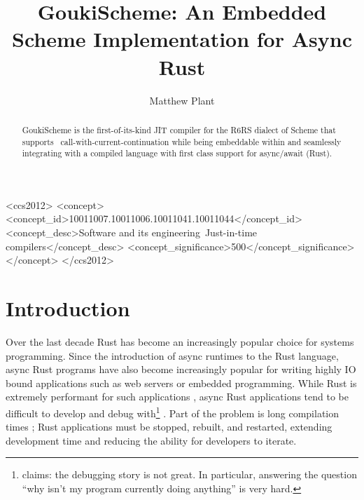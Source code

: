 \documentclass[sigplan]{acmart}
\begin{document}

\begin{CCSXML}
<ccs2012>
   <concept>
       <concept_id>10011007.10011006.10011041.10011044</concept_id>
       <concept_desc>Software and its engineering~Just-in-time compilers</concept_desc>
       <concept_significance>500</concept_significance>
       </concept>
 </ccs2012>
\end{CCSXML}


\title{GoukiScheme: An Embedded Scheme Implementation for Async Rust}

\author{Matthew Plant}

\begin{abstract}

  GoukiScheme is the first-of-its-kind JIT compiler for the R6RS dialect of
  Scheme that supports \
  call-with-current-continuation while being embeddable
  within and seamlessly integrating with a compiled language with first class
  support for async/await (Rust).

\end{abstract}

\maketitle

\section{Introduction}

Over the last decade Rust has become an increasingly popular choice for systems
programming. Since the introduction of async runtimes to the Rust language,
async Rust programs have also become increasingly popular for writing highly
IO bound applications such as web servers or embedded programming. While Rust
is extremely performant for such applications \cite{embedded}, async Rust
applications tend to be difficult to develop and debug with\footnote{\citet{debugger} claims: the debugging story is not great. In particular, answering the question “why isn’t my program currently doing anything” is very hard.}
. Part of the problem
is long compilation times \cite{slow}; Rust applications must be stopped, rebuilt, and
restarted, extending development time and reducing the ability for developers to
iterate.
\end{document}
